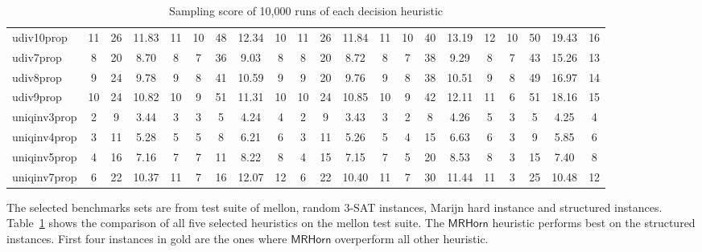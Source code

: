 \documentclass[runningheads]{llncs}
\newcommand{\rhorn}{\mathsf{MRHorn}}
\begin{document}
\begin{table}[]
{\begin{tabular}{ l|c  c c c| c c c c | c c c c | c c c c | c c c c|}
			udiv10prop & 11 & 26 & 11.83 & 11 & 10 & 48 & 12.34 & 10 & 11 & 26 & 11.84 & 11 & 10 & 40 & 13.19 & 12 & 10 & 50 & 19.43 & 16 \\\cline{1-21}  
			udiv7prop & 8 & 20 & 8.70 & 8 & 7 & 36 & 9.03 & 8 & 8 & 20 & 8.72 & 8 & 7 & 38 & 9.29 & 8 & 7 & 43 & 15.26 & 13 \\\cline{1-21}  
			udiv8prop & 9 & 24 & 9.78 & 9 & 8 & 41 & 10.59 & 9 & 9 & 20 & 9.76 & 9 & 8 & 38 & 10.51 & 9 & 8 & 49 & 16.97 & 14 \\\cline{1-21}  
			udiv9prop & 10 & 24 & 10.82 & 10 & 9 & 51 & 11.31 & 10 & 10 & 24 & 10.85 & 10 & 9 & 42 & 12.11 & 11 & 6 & 51 & 18.16 & 15 \\\cline{1-21}  
			uniqinv3prop & 2 & 9 & 3.44 & 3 & 3 & 5 & 4.24 & 4 & 2 & 9 & 3.43 & 3 & 2 & 8 & 4.26 & 5 & 3 & 5 & 4.25 & 4 \\\cline{1-21}  
			uniqinv4prop & 3 & 11 & 5.28 & 5 & 5 & 8 & 6.21 & 6 & 3 & 11 & 5.26 & 5 & 4 & 15 & 6.63 & 6 & 3 & 9 & 5.85 & 6 \\\cline{1-21}  
			uniqinv5prop & 4 & 16 & 7.16 & 7 & 7 & 11 & 8.22 & 8 & 4 & 15 & 7.15 & 7 & 5 & 20 & 8.53 & 8 & 3 & 15 & 7.40 & 8 \\\cline{1-21}  
			uniqinv7prop & 6 & 22 & 10.37 & 11 & 7 & 16 & 12.07 & 12 & 6 & 22 & 10.40 & 11 & 7 & 30 & 11.44 & 11 & 3 & 25 & 10.48 & 12 \\\cline{1-21}  
			\hline\hline
			
	\end{tabular} }
	\caption{Sampling score of 10,000 runs of each decision heuristic}
	\label{tab:dec-heuristic}
\end{table}

The selected benchmarks sets are from test suite of mellon, random 3-SAT instances, Marijn hard instance and structured instances. Table~\ref{tab:dec-heuristic} shows the comparison of all five selected heuristics on the mellon test suite. The $\rhorn$ heuristic performs best on the structured instances. First four instances in gold are the ones where $\rhorn$ overperform all other heuristic. 

\end{document}
